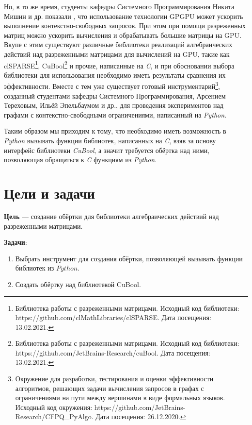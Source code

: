 \documentclass[14pt]{matmex-diploma}
\begin{document}
Но, в то же время, студенты кафедры Системного Программирования 
Никита Мишин и др. показали \cite{evaluation_cfpq_mm}, что использование технологии
GPGPU может ускорить выполнение контекстно-свободных запросов.
При этом при помощи разреженных матриц можно ускорить вычисления и обрабатывать большие матрицы на GPU.
Вкупе с этим существуют различные библиотеки реализаций алгебраических действий над разреженными матрицами
 для вычислений на GPU, такие как \\ 
clSPARSE\footnote{Библиотека работы с разреженными матрицами.
Исходный код библиотеки: https://github.com/clMathLibraries/clSPARSE. Дата посещения: 13.02.2021.},
CuBool\footnote{Библиотека работы с разреженными матрицами.
Исходный код библиотеки: https://github.com/JetBrains-Research/cuBool. Дата посещения: 13.02.2021.}
и прочие, написанные на \textit{C},
и при обосновании выбора библиотеки для использования необходимо иметь результаты сравнения их эффективности.
Вместе с тем уже существует готовый инструментарий\footnote{Окружение для разработки, тестирования и оценки эффективности 
алгоритмов, решающих задачи вычисления запросов в графах с ограничениями на пути между вершинами в виде формальных языков.
Исходный код окружения: https://github.com/JetBrains-Research/CFPQ\_PyAlgo. Дата посещения: 26.12.2020.
},
созданный студентами кафедры Системного Программирования, Арсением Тереховым, Ильёй Эпельбаумом и др.,
для проведения экспериментов над графами с контекстно-свободными ограничениями,
написанный на \textit{Python}.

Таким образом мы приходим к тому, что  
необходимо иметь возможность  в \textit{Python} вызывать функции библиотек, написанных на \textit{C},
взяв за основу интерфейс библиотеки \textit{CuBool},
а значит требуется обёртка над ними, 
позволяющая обращаться к \textit{C} функциям из \textit{Python}.



\section{Цели и задачи}
\textbf{Цель} --- создание обёртки для библиотеки алгебраических действий над разреженными матрицами. 

\textbf{Задачи}:
\begin{enumerate}
    \item Выбрать инструмент для создания обёртки, позволяющей вызывать функции библиотек из $Python$.
    \item Создать обёртку над библиотекой CuBool.
\end{enumerate}
\end{document}
